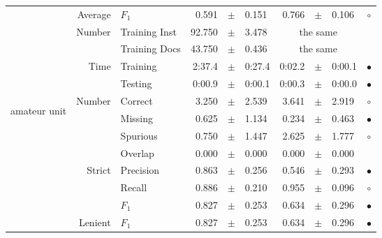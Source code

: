 \begin{longtable}{|r|r|l||rcl|rcl|c|}
\cline{2-10} &                     Average &           $F_1$ &       0.591 &  $\pm$  &       0.151 &       0.766 &  $\pm$  &       0.106 & $\circ$ \\
\cline{2-10} & \multirow{2}{*}{    Number} &   Training Inst &      92.750 &  $\pm$  &       3.478 &    \multicolumn{3}{c|}{the same}         &  \\
\cline{3-10} &                             &   Training Docs &      43.750 &  $\pm$  &       0.436 &    \multicolumn{3}{c|}{the same}         &  \\
\cline{2-10} & \multirow{2}{*}{      Time} &        Training &      2:37.4 &  $\pm$  &      0:27.4 &      0:02.2 &  $\pm$  &      0:00.1 & $\bullet$ \\
\cline{3-10} &                             &         Testing &      0:00.9 &  $\pm$  &      0:00.1 &      0:00.3 &  $\pm$  &      0:00.0 & $\bullet$ \\
\hline
\hline
\multirow{11}{*}{\begin{sideways}amateur unit\end{sideways} }
             & \multirow{4}{*}{    Number} &         Correct &       3.250 &  $\pm$  &       2.539 &       3.641 &  $\pm$  &       2.919 & $\circ$ \\
\cline{3-10} &                             &         Missing &       0.625 &  $\pm$  &       1.134 &       0.234 &  $\pm$  &       0.463 & $\bullet$ \\
\cline{3-10} &                             &        Spurious &       0.750 &  $\pm$  &       1.447 &       2.625 &  $\pm$  &       1.777 & $\circ$ \\
\cline{3-10} &                             &         Overlap &       0.000 &  $\pm$  &       0.000 &       0.000 &  $\pm$  &       0.000 &  \\
\cline{2-10} & \multirow{3}{*}{    Strict} &       Precision &       0.863 &  $\pm$  &       0.256 &       0.546 &  $\pm$  &       0.293 & $\bullet$ \\
\cline{3-10} &                             &          Recall &       0.886 &  $\pm$  &       0.210 &       0.955 &  $\pm$  &       0.096 & $\circ$ \\
\cline{3-10} &                             &           $F_1$ &       0.827 &  $\pm$  &       0.253 &       0.634 &  $\pm$  &       0.296 & $\bullet$ \\
\cline{2-10} &                     Lenient &           $F_1$ &       0.827 &  $\pm$  &       0.253 &       0.634 &  $\pm$  &       0.296 & $\bullet$ \\

\end{longtable}
